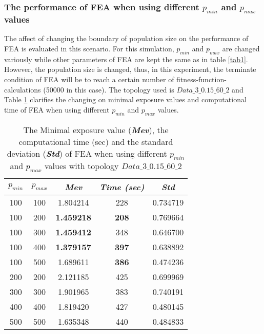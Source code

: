 \documentclass[final]{elsarticle}
\begin{document}
\subsubsection{The performance of FEA when using different $ p_{min} $ and $ p_{max} $ values}
The affect of changing the boundary of population size on the performance of FEA is evaluated in this scenario. For this simulation, $ p_{min} $ and $ p_{max} $ are changed variously while other parameters of FEA are kept the same as in table \ref{tab1}. However, the population size is changed, thus, in this experiment, the terminate condition of FEA will be to reach a certain number of fitness-function-calculations (50000 in this case). The topology used is $ Data\_3\_0.15\_60\_2 $ and Table \ref{tab2} clarifies the changing on minimal exposure values and computational time of FEA when using different $ p_{min} $ and $ p_{max} $ values.
\begin{table}
	\caption{The Minimal exposure value (\textbf{\textit{Mev}}), the computational time (sec) and the standard deviation (\textbf{\textit{Std}}) of FEA when using different $ p_{min} $ and $ p_{max} $ values with topology $ Data\_3\_0.15\_60\_2 $  }
	\label{tab2}       %
	\begin{center}
		\renewcommand{\arraystretch}{1.5}
		\begin{tabular}{|c|c|c|c|c|}
			\hline
			\textbf{$p_{min}$} & \textbf{$p_{max}$ } & \textit{\textbf{Mev}} &\textit{ \textbf{Time (sec)}} & \textit{\textbf{Std}} \\
			\hline
			100 & 100 &1.804214 &228 &0.734719\\
			\hline
			100 & 200 &\textbf{1.459218} &\textbf{208} &0.769664\\
			\hline
			100 & 300 &\textbf{1.459412} &348 &0.646700\\
			\hline
			100 & 400 &\textbf{1.379157} &\textbf{397} &0.638892\\
			\hline
			100 & 500 &1.689611 &\textbf{386} &0.474236\\
			\hline\hline
			200 & 200 &2.121185 &425 &0.699969\\\hline
			300 & 300 &1.901965 &383 &0.740191\\\hline
			400 & 400 &1.819420 &427 &0.480145\\\hline
			500 & 500 &1.635348 &440 &0.484833\\\hline
		\end{tabular}
	\end{center}
\end{table}
\end{document}
